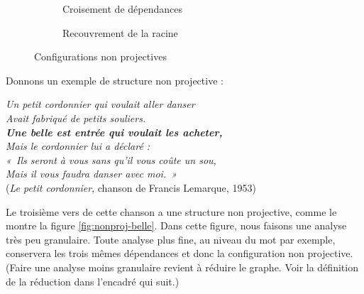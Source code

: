 \begin{figure}
\begin{subfigure}[b]{.5\linewidth}\centering
{}\caption{Croisement de dépendances}\end{subfigure}%
\begin{subfigure}[b]{.5\linewidth}\centering
{}\caption{Recouvrement de la racine}
\end{subfigure}
\caption{\label{fig:nonproj-config}Configurations non projectives}
\end{figure}

Donnons un exemple de structure non projective :

\ea\label{ex:belle-complet}
\textit{Un petit cordonnier qui voulait aller danser}\\
\textit{Avait fabriqué de petits souliers.}\\
\textit{\textbf{Une belle est entrée qui voulait les acheter,}}\\
\textit{Mais le cordonnier lui a déclaré :}\\
\textit{«~Ils seront à vous sans qu’il vous coûte un sou,}\\
\textit{Mais il vous faudra danser avec moi.~»}\\
\textrm{(\textit{Le petit cordonnier}, chanson de Francis Lemarque, 1953)}
\z

Le troisième vers de cette chanson a une structure non projective, comme le montre la figure \ref{fig:nonproj-belle}. Dans cette figure, nous faisons une analyse très peu granulaire. Toute analyse plus fine, au niveau du mot par exemple, conservera les trois mêmes dépendances et donc la configuration non projective. (Faire une analyse moins granulaire revient à réduire le graphe. Voir la définition de la réduction dans l’encadré qui suit.) 

